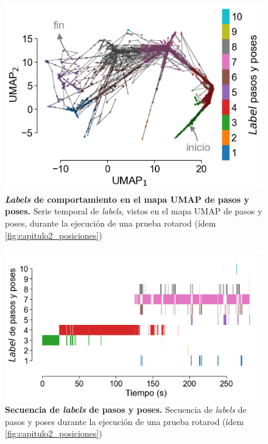 \begin{appendix}
    \begin{figure}[htbp]
        \centering
        \includegraphics[width=0.7\linewidth]{figuras/capitulo4/label_serie_mapa_stp.png}
        \caption{\textbf{\textit{Labels} de comportamiento en el mapa UMAP de pasos y poses.}
            Serie temporal de \textit{labels}, vistos en el mapa UMAP de pasos y poses, durante la ejecución de una prueba rotarod (ídem \autoref{fig:capitulo2_posiciones})}
        \label{fig:capitulo4_label_serie_mapa_stp}
    \end{figure}

    \begin{figure}[htbp]
        \centering
        \includegraphics[width=0.7\linewidth]{figuras/capitulo4/label_secuencia_stp.png}
        \caption{\textbf{Secuencia de \textit{labels} de pasos y poses.}
            Secuencia de \textit{labels} de pasos y poses durante la ejecución de una prueba rotarod (ídem \autoref{fig:capitulo2_posiciones})}
        \label{fig:capitulo4_label_secuencia_stp}
    \end{figure}


\end{appendix}
